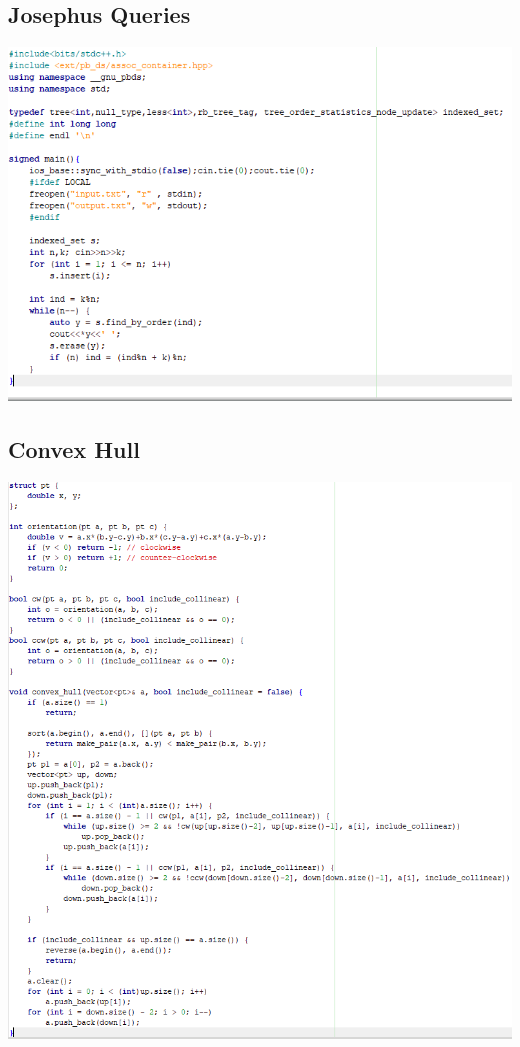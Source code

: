 \documentclass[11pt,twocolumn]{article}
\begin{document}
\subsection{Josephus Queries}

\includegraphics[scale=0.5]{josephus}

\subsection{Convex Hull}

\includegraphics[scale=0.6]{convex}
\end{document}
